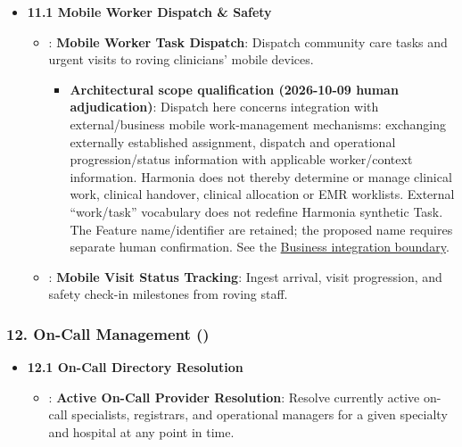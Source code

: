 \begin{itemize}

\item
\textbf{11.1 Mobile Worker Dispatch \& Safety}


\begin{itemize}

\item
\texttt{}: \textbf{Mobile Worker Task Dispatch}: Dispatch community care tasks and urgent visits to roving clinicians' mobile devices.


\begin{itemize}

\item
\textbf{Architectural scope qualification (2026-10-09 human adjudication)}: Dispatch here concerns integration with external/\allowbreak{}business mobile work-management mechanisms: exchanging externally established assignment, dispatch and operational progression/\allowbreak{}status information with applicable worker/\allowbreak{}context information. Harmonia does not thereby determine or manage clinical work, clinical handover, clinical allocation or EMR worklists. External “work/\allowbreak{}task” vocabulary does not redefine Harmonia synthetic Task. The Feature name/\allowbreak{}identifier are retained; the proposed name \texttt{} requires separate human confirmation. See the \hyperref[rad:metamodel:173]{Business integration boundary}.



\end{itemize}


\item
\texttt{}: \textbf{Mobile Visit Status Tracking}: Ingest arrival, visit progression, and safety check-in milestones from roving staff.



\end{itemize}


\end{itemize}
\label{rad:enabling:526}
\subsubsection*{12. On-Call Management (\texttt{})}
\label{rad:enabling:527}

\begin{itemize}

\item
\textbf{12.1 On-Call Directory Resolution}


\begin{itemize}

\item
\texttt{}: \textbf{Active On-Call Provider Resolution}: Resolve currently active on-call specialists, registrars, and operational managers for a given specialty and hospital at any point in time.



\end{itemize}


\end{itemize}
\label{rad:enabling:530}

